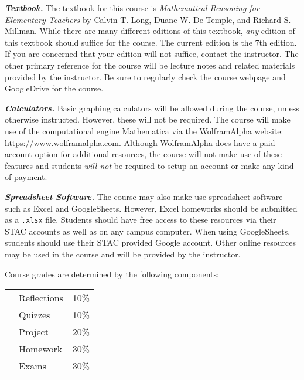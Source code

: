 \documentclass[11pt,letterpaper]{article}
\begin{document}
{\itshape\bfseries\color{stacred}Textbook.} The textbook for this course is \textit{Mathematical Reasoning for Elementary Teachers} by Calvin T. Long, Duane W. De Temple, and Richard S. Millman. While there are many different editions of this textbook, \textit{any} edition of this textbook should suffice for the course. The current edition is the 7th edition. If you are concerned that your edition will not suffice, contact the instructor. The other primary reference for the course will be lecture notes and related materials provided by the instructor. Be sure to regularly check the course webpage and GoogleDrive for the course. \pspace

{\itshape\bfseries\color{stacred}Calculators.} Basic graphing calculators will be allowed during the course, unless otherwise instructed. However, these will not be required. The course will make use of the computational engine Mathematica via the WolframAlpha website: \url{https://www.wolframalpha.com}. Although WolframAlpha does have a paid account option for additional resources, the course will not make use of these features and students {\itshape will not} be required to setup an account or make any kind of payment. \pspace

{\itshape\bfseries\color{stacred}Spreadsheet Software.} 
The course may also make use spreadsheet software such as Excel and GoogleSheets. However, Excel homeworks should be submitted as a \texttt{.xlsx} file. Students should have free access to these resources via their STAC accounts as well as on any campus computer. When using GoogleSheets, students should use their STAC provided Google account. Other online resources may be used in the course and will be provided by the instructor. 
\sectionbreak









Course grades are determined by the following components: \par
	\begin{table}[!ht]
        \begin{tabular}{clr}
        & Reflections & 10\% \\
        & Quizzes & 10\% \\
        & Project & 20\% \\
        & Homework & 30\% \\
        & Exams & 30\% 
        \end{tabular} 
        \end{table}
\sectionbreak
\end{document}

